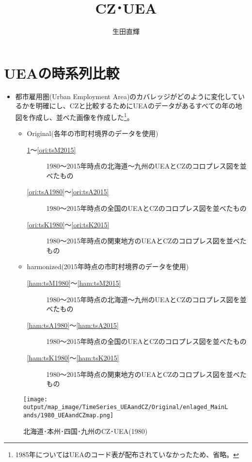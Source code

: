 \documentclass{ltjsarticle}
\title{CZ･UEA}
\author{生田直輝}
\begin{document}
\section{UEAの時系列比較}
\begin{itemize}
  \item 都市雇用圏(Urban Employment Area)のカバレッジがどのように変化しているかを明確にし、CZと比較するためにUEAのデータがあるすべての年の地図を作成し、並べた画像を作成した\footnote{1985年についてはUEAのコード表が配布されていなかったため、省略。}。
  \begin{itemize}
    \item Original(各年の市町村境界のデータを使用)
    \begin{description}
      \item[\ref{ori:tsM1980}～\ref{ori:tsM2015}] 1980～2015年時点の北海道～九州のUEAとCZのコロプレス図を並べたもの
      \item[\ref{ori:tsA1980}～\ref{ori:tsA2015}] 1980～2015年時点の全国のUEAとCZのコロプレス図を並べたもの
      \item[\ref{ori:tsK1980}～\ref{ori:tsK2015}] 1980～2015年時点の関東地方のUEAとCZのコロプレス図を並べたもの
    \end{description}

    \item harmonized(2015年時点の市町村境界のデータを使用)
    \begin{description}
      \item[\ref{ham:tsM1980}～\ref{ham:tsM2015}] 1980～2015年時点の北海道～九州のUEAとCZのコロプレス図を並べたもの
      \item[\ref{ham:tsA1980}～\ref{ham:tsA2015}] 1980～2015年時点の全国のUEAとCZのコロプレス図を並べたもの
      \item[\ref{ham:tsK1980}～\ref{ham:tsK2015}] 1980～2015年時点の関東地方のUEAとCZのコロプレス図を並べたもの
    \end{description}
  \end{itemize}
\end{itemize}

\begin{figure}[pbth]
  \centering
  \texttt{[image: output/map\_image/TimeSeries\_UEAandCZ/Original/enlaged\_MainLands/1980\_UEAandCZmap.png]}
  \caption{\label{ori:tsM1980}北海道･本州･四国･九州のCZ･UEA(1980)}
\end{figure}
\end{document}
